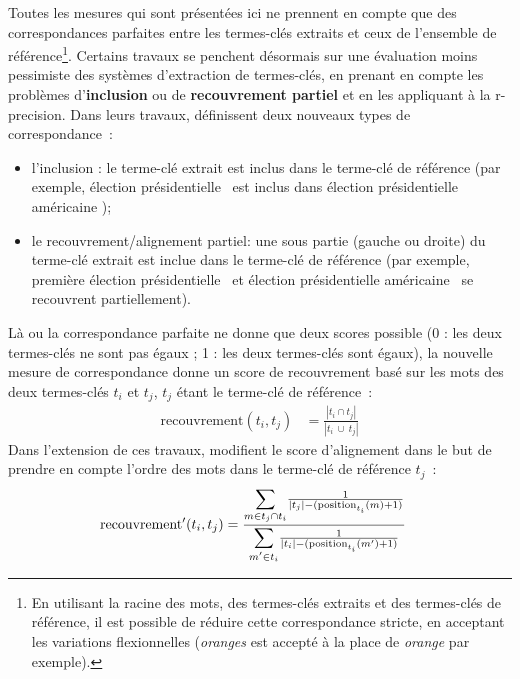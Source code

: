       Toutes les mesures qui sont présentées ici ne prennent en compte que des
      correspondances parfaites entre les termes-clés extraits et ceux de
      l'ensemble de référence\footnote{En utilisant la racine des mots, des
      termes-clés extraits et des termes-clés de référence, il est possible de
      réduire cette correspondance stricte, en acceptant les variations
      flexionnelles (\textit{oranges} est accepté à la place de \textit{orange}
      par exemple).}. Certains travaux se penchent désormais sur une évaluation
      moins pessimiste des systèmes d'extraction de termes-clés, en prenant en
      compte les problèmes d'\textbf{inclusion} ou de \textbf{recouvrement
      partiel} \citep{zesch2009rprecision, kim2010rprecision} et en les
      appliquant à la r-precision. Dans leurs travaux,
      \citet{zesch2009rprecision} définissent deux nouveaux types de
      correspondance~:
      \begin{itemize}
        \item{l'inclusion : le terme-clé extrait est inclus dans le terme-clé de
              référence (par exemple, \og élection présidentielle \fg\ est inclus
              dans \og élection présidentielle américaine \fg);}
        \item{le recouvrement/alignement partiel: une sous partie (gauche ou
              droite) du terme-clé extrait est inclue dans le terme-clé de
              référence (par exemple, \og première élection présidentielle \fg\ et
              \og élection présidentielle américaine \fg\ se recouvrent
              partiellement).}
      \end{itemize}
      Là ou la correspondance parfaite ne donne que deux scores possible (0 :
      les deux termes-clés ne sont pas égaux ; 1 : les deux termes-clés sont
      égaux), la nouvelle mesure de correspondance donne un score de
      recouvrement basé sur les mots des deux termes-clés $t_i$ et $t_j$, $t_j$
      étant le terme-clé de référence~:
      \begin{align}
        \text{recouvrement}(t_{i}, t_{j}) &= \frac{|t_{i} \cap t_{j}|}{|t_{i}\ \cup\ t_{j}|}
      \end{align}
      Dans l'extension de ces travaux, \citet{kim2010rprecision} modifient le
      score d'alignement dans le but de prendre en compte l'ordre des mots dans
      le terme-clé de référence $t_j$~:
      \begin{align}
        \text{recouvrement}'(t_{i}, t_{j}) &= \frac{\mathlarger{\sum}_{m \in t_{j} \cap t_{i}} \frac{1}{|t_{j}| - (\text{position}_{t_i}(m) + 1)}}{\mathlarger{\sum}_{m' \in t_{i}} \frac{1}{|t_{i}| - (\text{position}_{t_i}(m') + 1)}}
      \end{align}

